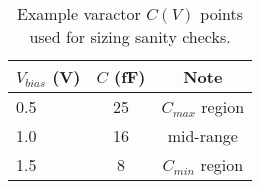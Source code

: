 \begin{table}[H]
  \centering
  \begin{tabular}{lcc}
    \toprule
    $V_{bias}$ (V) & $C$ (fF) & Note \\
    \midrule
    0.5 & 25 & $C_{max}$ region \\
    1.0 & 16 & mid-range \\
    1.5 & 8 & $C_{min}$ region \\
    \bottomrule
  \end{tabular}
  \caption{Example varactor $C(V)$ points used for sizing sanity checks.}
\end{table}


